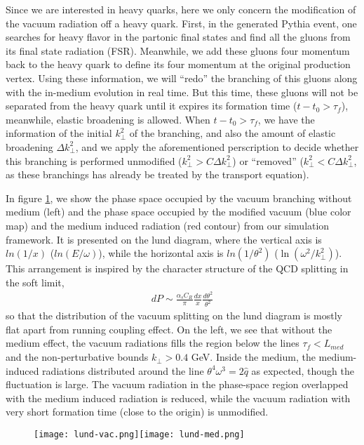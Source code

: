 Since we are interested in heavy quarks, here we only concern the modification of the vacuum radiation off a heavy quark.
First, in the generated Pythia event, one searches for heavy flavor in the partonic final states and find all the gluons from its final state radiation (FSR).
Meanwhile, we add these gluons four momentum back to the heavy quark to define its four momentum at the original production vertex.
Using these information, we will ``redo'' the branching of this gluons along with the in-medium evolution in real time.
But this time, these gluons will not be separated from the heavy quark until it expires its formation time ($t-t_0>\tau_f$), meanwhile, elastic broadening is allowed.
When $t-t_0>\tau_f$, we have the information of the initial $k_\perp^2$ of the branching, and also the amount of elastic broadening $\Delta k_\perp^2$, and we apply the aforementioned perscription to decide whether  this branching is performed unmodified ($k_\perp^2>C\Delta k_\perp^2$) or ``removed'' ($k_\perp^2<C\Delta k_\perp^2$, as these branchings has already be treated by the transport equation).

In figure \ref{fig:lund}, we show the phase space occupied by the vacuum branching without medium (left) and the phase space occupied by the modified vacuum (blue color map) and the medium induced radiation (red contour) from our simulation framework.
It is presented on the lund diagram, where the vertical axis is $ln(1/x)$ ($ln(E/\omega)$), while the horizontal axis is $ln(1/\theta^2)$ ($\ln(\omega^2/k_\perp^2)$).
This arrangement is inspired by the character structure of the QCD splitting in the soft limit,
\begin{eqnarray}
dP \sim \frac{\alpha_s C_R}{\pi} \frac{dx}{x}\frac{d\theta^2}{\theta^2}
\end{eqnarray}
so that the distribution of the vacuum splitting on the lund diagram is mostly flat apart from running coupling effect.
On the left, we see that without the medium effect, the vacuum radiations fills the region below the lines $\tau_f < L_{med}$ and the non-perturbative bounds $k_\perp > 0.4$ GeV. 
Inside the medium, the medium-induced radiations distributed around the line $\theta^4\omega^3 = 2\hat{q}$ as expected, though the fluctuation is large.
The vacuum radiation in the phase-space region overlapped with the medium induced radiation is reduced, while the vacuum radiation with very short formation time (close to the origin) is unmodified.

\begin{figure}
\texttt{[image: lund-vac.png]}\texttt{[image: lund-med.png]}
\caption{}
\label{fig:lund}
\end{figure}

